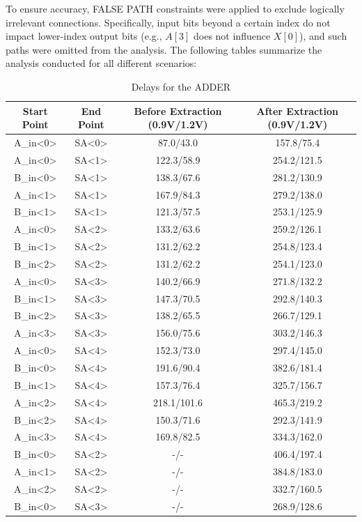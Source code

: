 \documentclass[a4paper,12pt]{article}
\begin{document}
To ensure accuracy, FALSE PATH constraints were applied to exclude logically irrelevant connections. Specifically, input bits beyond a certain index do not impact lower-index output bits (e.g., $A[3]$ does not influence $X[0]$), and such paths were omitted from the analysis.
The following tables summarize the analysis conducted for all different scenarios:
\begin{table}[h]
\caption{Delays for the ADDER}
\begin{tabular}{||c|c|c|c||}
\hline
\textbf{Start Point} & \textbf{End Point} & \textbf{Before Extraction (0.9V/1.2V)} & \textbf{After Extraction (0.9V/1.2V)} \\
\hline\hline
A\_in<0> & SA<0> & 87.0/43.0 & 157.8/75.4 \\
\hline
A\_in<0> & SA<1> & 122.3/58.9 & 254.2/121.5 \\
\hline
B\_in<0> & SA<1> & 138.3/67.6 & 281.2/130.9 \\
\hline
A\_in<1> & SA<1> & 167.9/84.3 & 279.2/138.0 \\
\hline
B\_in<1> & SA<1> & 121.3/57.5 & 253.1/125.9 \\
\hline
A\_in<0> & SA<2> & 133.2/63.6 & 259.2/126.1 \\
\hline
B\_in<1> & SA<2> & 131.2/62.2 & 254.8/123.4 \\
\hline
B\_in<2> & SA<2> & 131.2/62.2 & 254.1/123.0 \\
\hline
A\_in<0> & SA<3> & 140.2/66.9 & 271.8/132.2 \\
\hline
B\_in<1> & SA<3> & 147.3/70.5 & 292.8/140.3 \\
\hline
B\_in<2> & SA<3> & 138.2/65.5 & 266.7/129.1 \\
\hline
A\_in<3> & SA<3> & 156.0/75.6 & 303.2/146.3 \\
\hline
A\_in<0> & SA<4> & 152.3/73.0 & 297.4/145.0 \\
\hline
B\_in<0> & SA<4> & 191.6/90.4 & 382.6/181.4 \\
\hline
B\_in<1> & SA<4> & 157.3/76.4 & 325.7/156.7 \\
\hline
A\_in<2> & SA<4> & 218.1/101.6 & 465.3/219.2 \\
\hline
B\_in<2> & SA<4> & 150.3/71.6 & 292.3/141.9 \\
\hline
A\_in<3> & SA<4> & 169.8/82.5 & 334.3/162.0 \\
\hline
B\_in<0> & SA<2> & -/- & 406.4/197.4 \\
\hline
A\_in<1> & SA<2> & -/- & 384.8/183.0 \\
\hline
A\_in<2> & SA<2> & -/- & 332.7/160.5 \\
\hline
B\_in<0> & SA<3> & -/- & 268.9/128.6 \\
\hline
\end{tabular}
\end{table}
\end{document}

